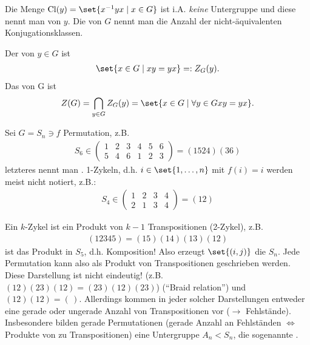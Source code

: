 \begin{definition}[Konjugationsklasse]
	Die Menge $\Cl(y) = \set{x^{-1}yx \mid x \in G}$ ist i.A. \emph{keine} Untergruppe und diese nennt man  von $y$. Die  von $G$ nennt man die Anzahl der nicht-äquivalenten Konjugationsklassen.
\end{definition}

\begin{definition}
	Der  von $y \in G$ ist
	\begin{align*}
		\set{x \in G \mid xy = yx} =: Z_G(y).
	\end{align*}
	Das  von G ist
	\begin{align*}
		Z(G) = \bigcap_{y \in G} Z_G(y) = \set{x \in G \mid \forall y \in G xy=yx}.
	\end{align*}
\end{definition}
\begin{example}
	Sei $G = S_n \ni f$ Permutation, z.B.
	\begin{align*} S_6 \in
		\begin{pmatrix}
		1 & 2 &3 &4 & 5 & 6\\
		5 & 4 & 6 & 1 & 2 & 3
		\end{pmatrix}  = (1524)(36)
	\end{align*}
	letzteres nennt man . 1-Zykeln, d.h. $i \in \set{1,\dots,n}$ mit $f(i)=i$ werden meist nicht notiert, z.B.:
	\begin{align*} S_4 \in 
		\begin{pmatrix}
			1&2&3&4\\
			2&1&3&4
		\end{pmatrix} = (12)
	\end{align*}
\end{example}
\begin{remark}
	Ein $k$-Zykel ist ein Produkt von $k-1$ Transpositionen (2-Zykel), z.B.
	\begin{align*}
		(12345) = (15)(14)(13)(12)
	\end{align*}
	ist das Produkt in $S_5$, d.h. Komposition! Also erzeugt $\set{(i,j)}$ die $S_n$. Jede Permutation kann also als Produkt von Transpositionen geschrieben werden. Diese Darstellung ist nicht eindeutig! (z.B. $(12)(23)(12) = (23)(12)(23)$) (``Braid relation'') %
	und $(12)(12) = (\,)$. Allerdings kommen in jeder solcher Darstellungen entweder eine gerade oder ungerade Anzahl von Transpositionen vor ($\to$ Fehlstände). Insbesondere bilden gerade Permutationen (gerade Anzahl an Fehlständen $\Leftrightarrow$ Produkte von zu Transpositionen) eine Untergruppe $A_n < S_n$, die sogenannte .
\end{remark}
